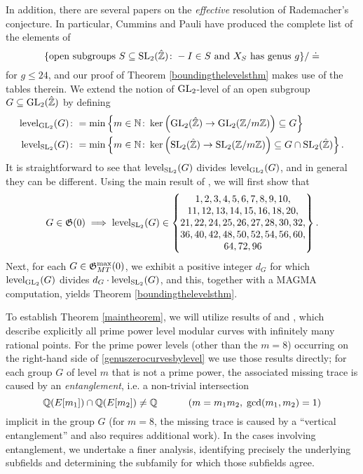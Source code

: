 In addition, there are several papers on the \emph{effective} resolution of Rademacher's conjecture.  In particular, Cummins and Pauli \cite{cumminspauli} have produced the complete list of the elements of 
\[
\{ \text{open subgroups } S \subseteq \operatorname{SL}_2(\hat{\mathbb{Z}}) \colon -I \in S \text{ and } X_S \text{ has genus } g \} / \doteq
\]
for $g \leq 24$, and our proof of Theorem \ref{boundingthelevelsthm} makes use of the tables therein.
We extend the notion of $\operatorname{GL}_2$-level of an open subgroup $G \subseteq \operatorname{GL}_2(\hat{\mathbb{Z}})$ by defining
\begin{equation} \label{defofGL2levelandSL2level}
\begin{split}
\operatorname{level}_{\operatorname{GL}_2}(G) &\colon= \min \left\{ m \in \mathbb{N} \colon \ker \left( \operatorname{GL}_2(\hat{\mathbb{Z}}) \rightarrow \operatorname{GL}_2(\mathbb{Z}/m\mathbb{Z}) \right) \subseteq G \right\} \\
\operatorname{level}_{\operatorname{SL}_2}(G) &\colon= \min \left\{ m \in \mathbb{N} \colon \ker \left( \operatorname{SL}_2(\hat{\mathbb{Z}}) \rightarrow \operatorname{SL}_2(\mathbb{Z}/m\mathbb{Z}) \right) \subseteq G \cap \operatorname{SL}_2(\hat{\mathbb{Z}}) \right\}.
\end{split}
\end{equation}
It is straightforward to see that $\operatorname{level}_{\operatorname{SL}_2}(G)$ divides $\operatorname{level}_{\operatorname{GL}_2}(G)$, and in general they can be different.  Using the main result of \cite{cumminspauli}, we will first show that
\begin{equation} \label{takingcumminspaulifurther}
G \in \mathfrak{G}(0) \; \Longrightarrow \; \operatorname{level}_{\operatorname{SL}_2}(G) \in \left\{ \begin{matrix} 
1, 2, 3, 4, 5, 6, 7, 8, 9, 10, \\
11, 12, 13, 14, 15, 16, 18, 20, \\
21, 22, 24, 25, 26, 27, 28, 30, 32, \\
36, 40, 42, 48, 50, 52, 54, 56, 60, \\
64, 72, 96 \end{matrix} \right\}.
\end{equation}
Next, for each $G \in \mathfrak{G}_{MT}^{\max}(0)$, we exhibit a positive integer $d_G$ for which $\operatorname{level}_{\operatorname{GL}_2}(G)$ divides $d_G \cdot \operatorname{level}_{\operatorname{SL}_2}(G)$, and this, together with a MAGMA computation, yields Theorem \ref{boundingthelevelsthm}.

To establish Theorem \ref{maintheorem}, we will utilize results of \cite{sutherlandzywina} and \cite{zywina}, which describe explicitly all prime power level modular curves with infinitely many rational points.  For the prime power levels (other than the $m=8$) occurring on the right-hand side of \eqref{genuszerocurvesbylevel} we use those results directly; for each group $G$ of level $m$ that is not a prime power, the associated missing trace is caused by an \emph{entanglement}, i.e. a non-trivial intersection
\[
\mathbb{Q}(E[m_1]) \cap \mathbb{Q}(E[m_2]) \neq \mathbb{Q} \quad\quad\quad \left(m = m_1m_2, \; \gcd(m_1,m_2) = 1 \right)
\]
implicit in the group $G$ (for $m=8$, the missing trace is caused by a ``vertical entanglement'' and also requires additional work).  In the cases involving entanglement, we undertake a finer analysis, identifying precisely the underlying subfields and determining the subfamily for which those subfields agree.  

